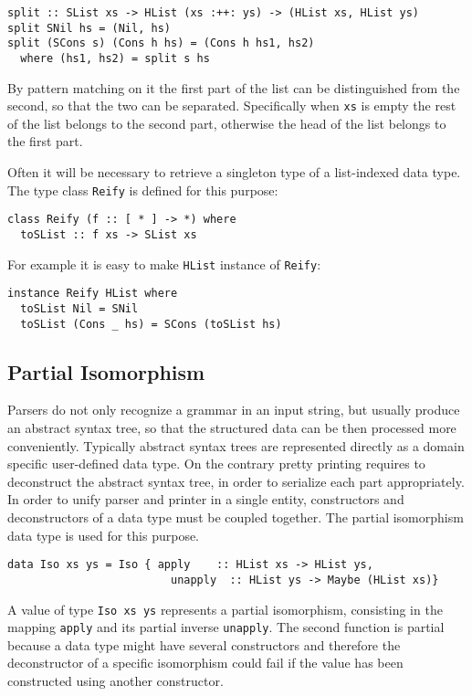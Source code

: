 \documentclass[../Thesis.tex]{subfiles}
\begin{document}
\begin{verbatim}
split :: SList xs -> HList (xs :++: ys) -> (HList xs, HList ys)
split SNil hs = (Nil, hs) 
split (SCons s) (Cons h hs) = (Cons h hs1, hs2)
  where (hs1, hs2) = split s hs
\end{verbatim}
	By pattern matching on it the first part of the list can be distinguished from 
	the second, so that the two can be separated.
	Specifically when \texttt{xs} is empty the rest of the list belongs
	to the second part, otherwise the head of the list belongs
	to the first part.
	
	Often it will be necessary to retrieve a singleton type of a list-indexed data 
	type. The type class \texttt{Reify} is defined for this purpose:
	
\begin{verbatim}
class Reify (f :: [ * ] -> *) where
  toSList :: f xs -> SList xs
\end{verbatim}

	For example it is easy to make \texttt{HList} instance of \texttt{Reify}:
\begin{verbatim}
instance Reify HList where
  toSList Nil = SNil
  toSList (Cons _ hs) = SCons (toSList hs)
\end{verbatim}	
	
\subsection{Partial Isomorphism}	
\label{subsec:PartIso}
Parsers do not only recognize a grammar in an input string, but usually
produce an abstract syntax tree, so that the structured data can be
then processed more conveniently. 
Typically abstract syntax trees are represented directly as a domain
specific user-defined data type. 
On the contrary pretty printing requires to deconstruct the abstract syntax tree, in order to serialize each part appropriately.
In order to unify parser and printer in a single entity, constructors
and deconstructors of a data type must be coupled together.
The partial isomorphism data type is used for this purpose.

\begin{verbatim}
data Iso xs ys = Iso { apply    :: HList xs -> HList ys, 
                         unapply  :: HList ys -> Maybe (HList xs)}
\end{verbatim}

A value of type \texttt{Iso xs ys} represents a partial isomorphism, consisting in the mapping \texttt{apply} and its partial inverse \texttt{unapply}.
The second function is partial because a data type might have
several constructors and therefore the deconstructor of
a specific isomorphism could fail if the value has been
constructed using another constructor.
\end{document}
